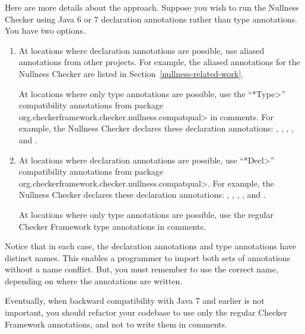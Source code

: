 Here are more details about the approach.
Suppose you wish to run the Nullness Checker using Java 6 or 7
declaration annotations rather than type annotations.  You have two options.

\begin{enumerate}
\item
At locations where declaration annotations are possible,
use aliased annotations from other projects.  For example, the aliased
annotations for the Nullness Checker are listed in
Section~\ref{nullness-related-work}.

\begin{sloppypar}
At locations where only type annotations are possible, use the
``\<*Type>'' compatibility annotations from package
\<org.checkerframework.checker.nullness.compatqual>
in comments.  For example, the Nullness Checker
declares these declaration annotations:
,
,
,
, and
.
\end{sloppypar}

\item
At locations where declaration annotations are possible,
use ``\<*Decl>'' compatibility annotations from package
\<org.checkerframework.checker.nullness.compatqual>.
For example, the Nullness Checker
declares these declaration annotations:
,
,
,
, and
.

At locations where only type annotations are possible, use the regular
Checker Framework type annotations in comments.
\end{enumerate}

Notice that in each case, the declaration annotations and type annotations
have distinct names.  This enables a programmer to import both sets of
annotations without a name conflict.  But, you must remember to use the
correct name, depending on where the annotations are written.

Eventually, when backward compatibility with Java 7 and earlier is not important,
you should refactor your codebase to use only the regular Checker Framework
annotations, and not to write them in comments.




